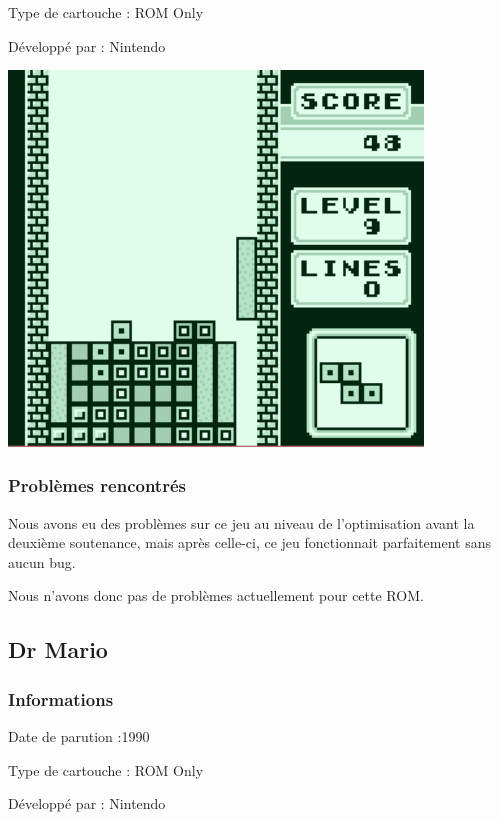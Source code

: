\documentclass[12pt, a4paper]{article}
\begin{document}
Type de cartouche : ROM Only

Développé par : Nintendo

\bigskip
\begin{center}
\includegraphics[width=11cm]{Capture3.PNG}
\end{center}

\bigskip
\subsubsection{Problèmes rencontrés}
Nous avons eu des problèmes sur ce jeu au niveau de l'optimisation avant la deuxième soutenance, mais après celle-ci, ce jeu fonctionnait parfaitement sans aucun bug.

\bigskip
Nous n'avons donc pas de problèmes actuellement pour cette ROM.



\pagebreak
\subsection{Dr Mario}

\subsubsection{Informations}

Date de parution :1990

Type de cartouche : ROM Only

Développé par : Nintendo
\end{document}
